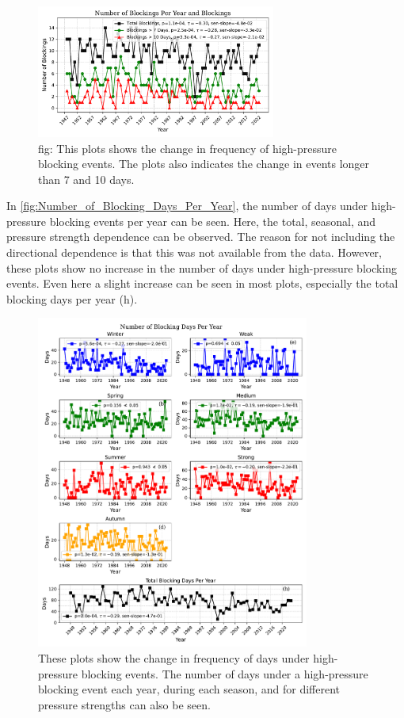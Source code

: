 \begin{figure}[H]
    \centering
    \includegraphics[width=0.7\textwidth]{Figures/BlockingsPerYear.pdf}
    \caption{fig: This plots shows the change in frequency of high-pressure blocking events. The plots also indicates the change in events longer than 7 and 10 days. }
    \label{fig:number_of_blockings}
\end{figure}

In \autoref{fig:Number_of_Blocking_Days_Per_Year}, the number of days under high-pressure blocking events per year can be seen. Here, the total, seasonal, and pressure strength dependence can be observed. The reason for not including the directional dependence is that this was not available from the data. However, these plots show no increase in the number of days under high-pressure blocking events. Even here a slight increase can be seen in most plots, especially the total blocking days per year (h). 


\begin{figure}[H]
    \centering
    \includegraphics[width=0.8\textwidth]{Figures/blocking_days_per_year_all.pdf}
    \caption{These plots show the change in frequency of days under high-pressure blocking events. The number of days under a high-pressure blocking event each year, during each season, and for different pressure strengths can also be seen.}
    \label{fig:Number_of_Blocking_Days_Per_Year}
\end{figure}






